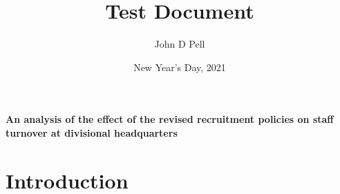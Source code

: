 \documentclass[12pt,english,lecture]{gWmaths}
\author{John D Pell}
\title{Test Document}
\date{New Year's Day, 2021}
\begin{document}
	\maketitle
	\begin{abstract}
		\blindtext
	\end{abstract}

\tableofcontents
\listoffigures
\listoftables

\paragraph[Effect on staff turnover]{An analysis of the
effect of the revised recruitment policies on staff
turnover at divisional headquarters}

{}
\section*{Introduction}

	\blinddocument
\end{document}
